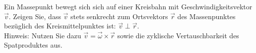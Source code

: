 \begin{ExerciseBlock}
Ein Massepunkt bewegt sich sich auf einer Kreisbahn mit Geschwindigkeitsvektor $\vec{v}$. Zeigen Sie, dass $\vec{v}$ stets senkrecht zum Ortsvektors $\vec{r}$ des Massenpunktes bezüglich des Kreismittelpunktes ist: $\vec{v} \perp \vec{r}$. \\

Hinweis: Nutzen Sie dazu $\vec{v} = \vec{\omega} \times \vec{r}$ sowie die zyklische Vertauschbarkeit des Spatproduktes aus.
\end{ExerciseBlock}
